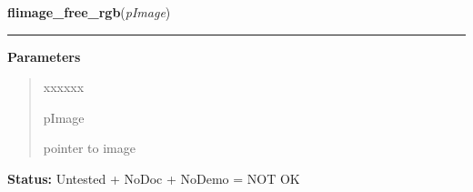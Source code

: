     \label{xformslib:library:flimage_free_rgb}

    \vspace{0.5ex}

\hspace{.8\funcindent}\begin{boxedminipage}{\funcwidth}

    \raggedright \textbf{flimage\_free\_rgb}(\textit{pImage})

    \vspace{-1.5ex}

    \rule{\textwidth}{0.5\fboxrule}
\setlength{\parskip}{2ex}
\setlength{\parskip}{1ex}
      \textbf{Parameters}
      \vspace{-1ex}

      \begin{quote}
        \begin{Ventry}{xxxxxx}

          \item[pImage]

          pointer to image

        \end{Ventry}

      \end{quote}

\textbf{Status:} Untested + NoDoc + NoDemo = NOT OK



    \end{boxedminipage}

    \label{xformslib:library:flimage_freemem}

    \vspace{0.5ex}

